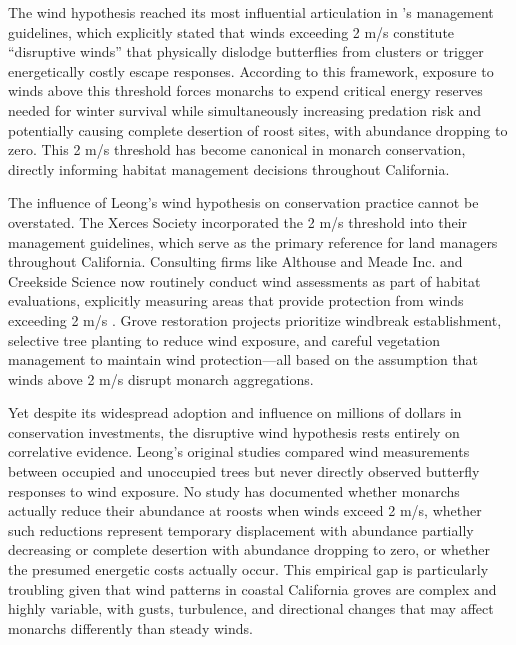The wind hypothesis reached its most influential articulation in \citet{leongEvaluationManagementCalifornia2016}'s management guidelines, which explicitly stated that winds exceeding 2 m/s constitute ``disruptive winds'' that physically dislodge butterflies from clusters or trigger energetically costly escape responses. According to this framework, exposure to winds above this threshold forces monarchs to expend critical energy reserves needed for winter survival while simultaneously increasing predation risk and potentially causing complete desertion of roost sites, with abundance dropping to zero. This 2 m/s threshold has become canonical in monarch conservation, directly informing habitat management decisions throughout California.

The influence of Leong's wind hypothesis on conservation practice cannot be overstated. The Xerces Society incorporated the 2 m/s threshold into their management guidelines, which serve as the primary reference for land managers throughout California. %
Consulting firms like Althouse and Meade Inc. and Creekside Science now routinely conduct wind assessments as part of habitat evaluations, explicitly measuring areas that provide protection from winds exceeding 2 m/s \citep{althouse&meadeinc.EllwoodMesaSperling2023}. Grove restoration projects prioritize windbreak establishment, selective tree planting to reduce wind exposure, and careful vegetation management to maintain wind protection---all based on the assumption that winds above 2 m/s disrupt monarch aggregations.

Yet despite its widespread adoption and influence on millions of dollars in conservation investments, the disruptive wind hypothesis rests entirely on correlative evidence. Leong's original studies compared wind measurements between occupied and unoccupied trees but never directly observed butterfly responses to wind exposure. No study has documented whether monarchs actually reduce their abundance at roosts when winds exceed 2 m/s, whether such reductions represent temporary displacement with abundance partially decreasing or complete desertion with abundance dropping to zero, or whether the presumed energetic costs actually occur. This empirical gap is particularly troubling given that wind patterns in coastal California groves are complex and highly variable, with gusts, turbulence, and directional changes that may affect monarchs differently than steady winds.

